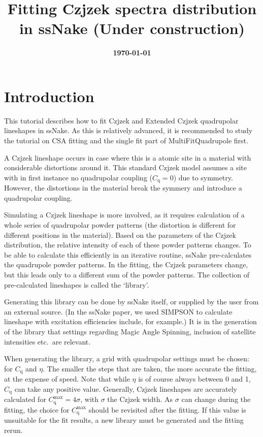 \documentclass[11pt,a4paper]{article}
\title{\color{black}\fontfamily{SourceSansPro-LF}\bfseries Fitting Czjzek spectra distribution in ssNake (Under construction)}
\author{}
\date{\color{black}\fontfamily{SourceSansPro-LF}\bfseries \today}
\begin{document}

\maketitle

\section{Introduction}
This tutorial describes how to fit Czjzek and Extended Czjzek quadrupolar lineshapes in ssNake. As this is relatively advanced, it is recommended to study the tutorial on CSA fitting and the single fit part of MultiFitQuadrupole first.

A Czjzek lineshape occurs in case where this is a atomic site in a material with considerable distortions around it. This standard Czjzek model assumes a site with in first instance no quadrupolar coupling ($C_\text{q}=0$) due to symmetry. However, the distortions in the material break the symmery and introduce a quadrupolar coupling.

Simulating a Czjzek lineshape is more involved, as it requires calculation of a whole series of quadrupolar powder patterns (the distortion is different for different positions in the material). Based on the parameters of the Czjzek distribution, the relative intensity of each of these powder patterns changes. To be able to calculate this efficiently in an iterative routine, ssNake pre-calculates the quadrupole powder patterns. In the fitting, the Czjzek parameters change, but this leads only to a different sum of the powder patterns. The collection of pre-calculated lineshapes is called the `library'.

Generating this library can be done by ssNake itself, or supplied by the user from an external source. (In the ssNake paper, we used SIMPSON to calculate lineshape with excitation efficiencies include, for example.) It is in the generation of the library that settings regarding Magic Angle Spinning, inclusion of satellite intensities etc.\ are relevant.

When generating the library, a grid with quadrupolar settings must be chosen: for $C_\text{q}$ and $\eta$. The smaller the steps that are taken, the more accurate the fitting, at the expense of speed. Note that while $\eta$ is of course always between 0 and 1, $C_\text{q}$ can take any positive value. Generally, Czjzek lineshapes are accurately calculated for $C_\text{q}^\text{max} = 4\sigma$, with $\sigma$ the Czjzek width. As $\sigma$ can change during the fitting, the choice for $C_\text{q}^\text{max}$ should be revisited after the fitting. If this value is unsuitable for the fit results, a new library must be generated and the fitting rerun.
\end{document}
